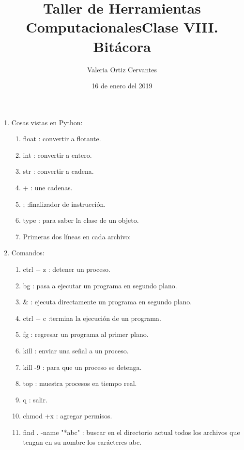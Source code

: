 \documentclass{article}
\title{\Huge Taller de Herramientas Computacionales}
\author{Valeria Ortiz Cervantes}
\date{16 de enero del 2019}
\begin{document}
	\maketitle
	\newpage
	\title{Clase VIII. Bitácora\\}
	\begin{enumerate}
		\item Cosas vistas en Python:
		\begin{enumerate}
			\item float : convertir a flotante.
		    \item int : convertir a entero.
		    \item str : convertir a cadena.
		    \item + : une cadenas.
		    \item ; :finalizador de instrucción.
		    \item type : para saber la clase de un objeto.
		    \item Primeras dos líneas en cada archivo:
		\end{enumerate}
		\item Comandos: 
		\begin{enumerate}
			\item ctrl + z : detener un proceso.
			\item bg : pasa a ejecutar un programa en segundo plano.
			\item $\&$ : ejecuta directamente un programa en segundo plano. 
			\item ctrl + c :termina la ejecución de un programa.
			\item fg : regresar un programa al primer plano.
			\item kill : enviar una señal a un proceso.
			\item kill -9 : para que un proceso se detenga.
			\item top : muestra procesos en tiempo real.
			\item q : salir.
			\item chmod +x : agregar permisos.
			\item find . -name "*abc" : buscar en el directorio actual todos los archivos que tengan en su nombre los carácteres abc.
		\end{enumerate}

\end{enumerate}
\end{document}
